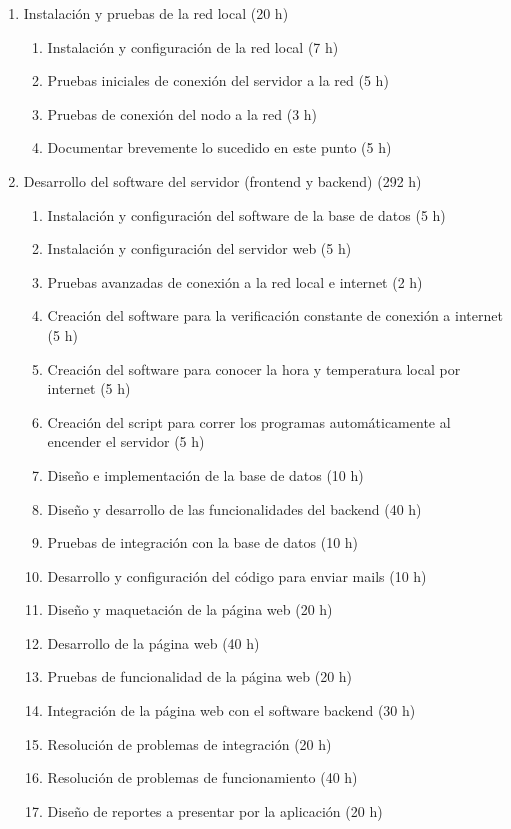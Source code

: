 \documentclass[
11pt, %
]{charter}
\begin{document}
\begin{enumerate}
\begin{enumerate}
	\end{enumerate}
\item Instalación y pruebas de la red local (20 h)
	\begin{enumerate}
		\item Instalación y configuración de la red local (7 h)
		\item Pruebas iniciales de conexión del servidor a la red (5 h)
		\item Pruebas de conexión del nodo a la red (3 h)
		\item Documentar brevemente lo sucedido en este punto (5 h)
	\end{enumerate}
\item Desarrollo del software del servidor (frontend y backend) (292 h)
	\begin{enumerate}
		\item Instalación y configuración del software de la base de datos (5 h)
		\item Instalación y configuración del servidor web (5 h)
		\item Pruebas avanzadas de conexión a la red local e internet (2 h)
		\item Creación del software para la verificación constante de conexión a internet (5 h)
		\item Creación del software para conocer la hora y temperatura local por internet (5 h)
		\item Creación del script para correr los programas automáticamente al encender el servidor (5 h)
		\item Diseño e implementación de la base de datos (10 h)
		\item Diseño y desarrollo de las funcionalidades del backend (40 h)
		\item Pruebas de integración con la base de datos (10 h)
		\item Desarrollo y configuración del código para enviar mails (10 h)
		\item Diseño y maquetación de la página web (20 h)
		\item Desarrollo de la página web (40 h)
		\item Pruebas de funcionalidad de la página web (20 h)
		\item Integración de la página web con el software backend (30 h)
		\item Resolución de problemas de integración (20 h)
		\item Resolución de problemas de funcionamiento (40 h)
		\item Diseño de reportes a presentar por la aplicación (20 h)

\end{enumerate}
\end{enumerate}
\end{document}
